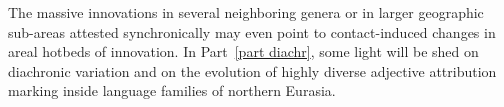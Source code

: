 The massive innovations in several neighboring genera or in larger geographic sub-areas attested synchronically may even point to contact-induced changes in areal hotbeds of innovation. In Part~\ref{part diachr}, some light will be shed on diachronic variation and on the evolution of highly diverse adjective attribution marking inside language families of northern Eurasia.
